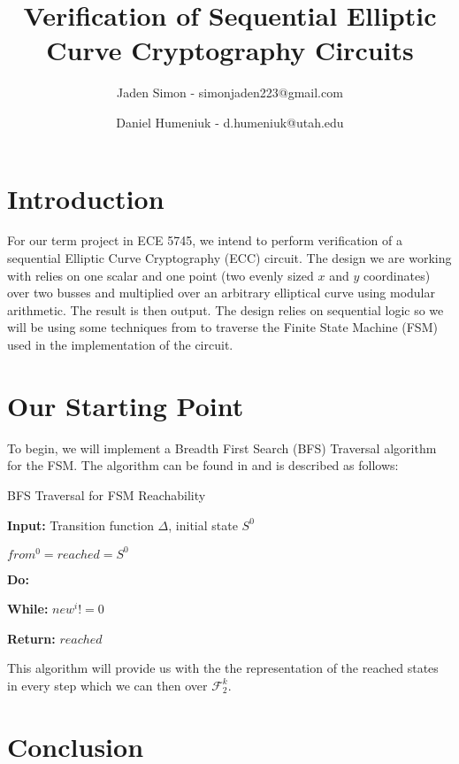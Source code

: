 \documentclass[12pt]{report}
\title{Verification of Sequential Elliptic Curve Cryptography Circuits}
\author{Jaden Simon - simonjaden223@gmail.com \\ \and
	   Daniel Humeniuk - d.humeniuk@utah.edu}
\begin{document}
\maketitle

\section{Introduction}

For our term project in ECE 5745, we intend to perform verification of a sequential Elliptic Curve Cryptography (ECC) circuit. The design we are working with relies on  one scalar and one point (two evenly sized $x$ and $y$ coordinates) over two busses and multiplied over an arbitrary elliptical curve using modular arithmetic. The result is then output. The design relies on sequential logic so we will be using some techniques from \cite{Kalla} to traverse the Finite State Machine (FSM) used in the implementation of the circuit.

\section{Our Starting Point}

To begin, we will implement a Breadth First Search (BFS) Traversal algorithm for the FSM. The algorithm can be found in \cite{Kalla} and is described as follows:

\begin{algorithm}
\caption{BFS Traversal for FSM Reachability}

{\textbf{Input:} Transition function $\Delta$, initial state $S^0$}

{$from^0=reached=S^0$}

{\textbf{Do:}}

\hspace*{6mm}{$i \leftarrow i + 1 $}


\hspace*{6mm}{$new^i \leftarrow to^i \cap reached$}

\hspace*{6mm}{$reached \leftarrow reached \cup new^i$}

\hspace*{6mm}{$from^i \leftarrow new^i$}

{\textbf{While:} $new^i != 0$}

{\textbf{Return:} $reached$}

\end{algorithm}

This algorithm will provide us with the the representation of the reached states in every step which we can then over $\mathcal{F}_2^k$. 

\section{Conclusion}




\end{document}
